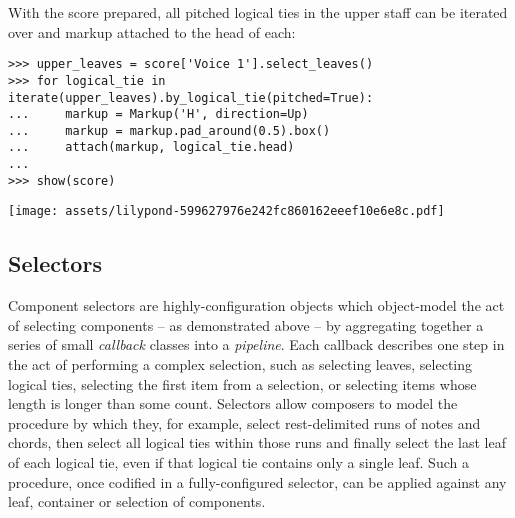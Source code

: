 \noindent With the score prepared, all pitched logical ties in the upper staff
can be iterated over and markup attached to the head of each:

\begin{comment}
<abjad>
upper_leaves = score['Voice 1'].select_leaves()
for logical_tie in iterate(upper_leaves).by_logical_tie(pitched=True):
    markup = Markup('H', direction=Up)
    markup = markup.pad_around(0.5).box()
    attach(markup, logical_tie.head)

show(score)
</abjad>
\end{comment}

\begin{abjadbookoutput}
\begin{singlespacing}
\vspace{-0.5\baselineskip}
\begin{verbatim}
>>> upper_leaves = score['Voice 1'].select_leaves()
>>> for logical_tie in iterate(upper_leaves).by_logical_tie(pitched=True):
...     markup = Markup('H', direction=Up)
...     markup = markup.pad_around(0.5).box()
...     attach(markup, logical_tie.head)
...
>>> show(score)
\end{verbatim}
\noindent\texttt{[image: assets/lilypond-599627976e242fc860162eeef10e6e8c.pdf]}
\end{singlespacing}
\end{abjadbookoutput}

\subsection{Selectors}
\label{ssec:selectors}

Component selectors are highly-configuration objects which object-model the act
of selecting components -- as demonstrated above -- by aggregating together a
series of small \emph{callback} classes into a \emph{pipeline}. Each callback
describes one step in the act of performing a complex selection, such as
selecting leaves, selecting logical ties, selecting the first item from a
selection, or selecting items whose length is longer than some count. Selectors
allow composers to model the procedure by which they, for example, select
rest-delimited runs of notes and chords, then select all logical ties within
those runs and finally select the last leaf of each logical tie, even if that
logical tie contains only a single leaf. Such a procedure, once codified in a
fully-configured selector, can be applied against any leaf, container or
selection of components.

